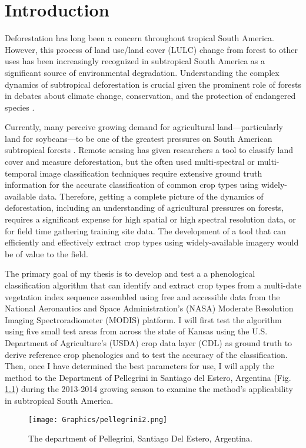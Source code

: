 \chapter{Introduction}

Deforestation has long been a concern throughout tropical South America. However, this process of land use/land cover (LULC) change from forest to other uses has been increasingly recognized in subtropical South America as a significant source of environmental degradation. Understanding the complex dynamics of subtropical deforestation is crucial given the prominent role of forests in debates about climate change, conservation, and the protection of endangered species \autocites{geist2002proximate}{zak2004do-subtropical}{bonnie2000counting}{houghton1994the-worldwide}{sala2000global}.

Currently, many perceive growing demand for agricultural land---particularly land for soybeans---to be one of the greatest pressures on South American subtropical forests \autocites{pengue2005transgenic}{grau2005agriculture}{altieri2006gm-soybean:}. Remote sensing has given researchers a tool to classify land cover and measure deforestation, but the often used multi-spectral or multi-temporal image classification techniques require extensive ground truth information for the accurate classification of common crop types using widely-available data. Therefore, getting a complete picture of the dynamics of deforestation, including an understanding of agricultural pressures on forests, requires a significant expense for high spatial or high spectral resolution data, or for field time gathering training site data. The development of a tool that can efficiently and effectively extract crop types using widely-available imagery would be of value to the field.

The primary goal of my thesis is to develop and test a a phenological classification algorithm that can identify and extract crop types from a multi-date vegetation index sequence assembled using free and accessible data from the National Aeronautics and Space Administration’s (NASA) Moderate Resolution Imaging Spectroradiometer (MODIS) platform. I will first test the algorithm using five small test areas from across the state of Kansas using the U.S. Department of Agriculture's (USDA) crop data layer (CDL) as ground truth to derive reference crop phenologies and to test the accuracy of the classification. Then, once I have determined the best parameters for use, I will apply the method to the Department of Pellegrini in Santiago del Estero, Argentina (Fig. \ref{fig:pellegrini}) during the 2013-2014 growing season to examine the method's applicability in subtropical South America.

\begin{figure}
  \centering
  \texttt{[image: Graphics/pellegrini2.png]}
  \caption{The department of Pellegrini, Santiago Del Estero, Argentina.}
  \label{fig:pellegrini}
\end{figure}
